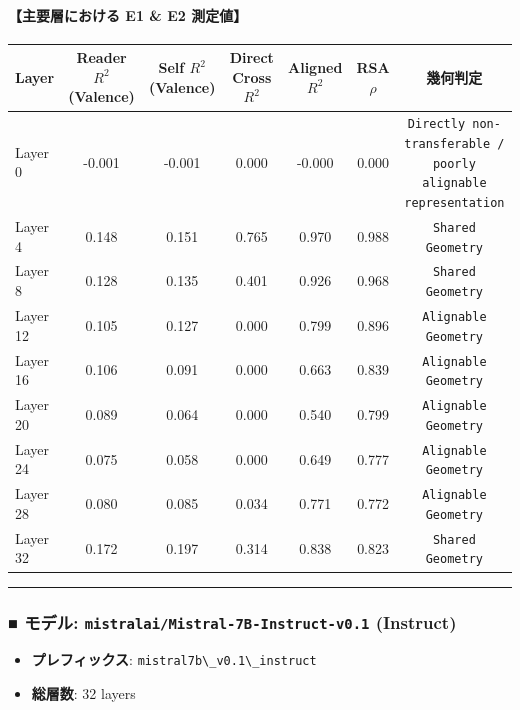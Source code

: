 \paragraph{【主要層における E1 \& E2 測定値】}
\begin{center}
\small
\begin{tabular}{lcccccc}
\toprule
\textbf{Layer} & \textbf{Reader $R^2$ (Valence)} & \textbf{Self $R^2$ (Valence)} & \textbf{Direct Cross $R^2$} & \textbf{Aligned $R^2$} & \textbf{RSA $\rho$} & \textbf{幾何判定} \\
\midrule
Layer  0 & -0.001 & -0.001 & 0.000 & -0.000 & 0.000 & \texttt{Directly non-transferable / poorly alignable representation} \\
Layer  4 & 0.148 & 0.151 & 0.765 & 0.970 & 0.988 & \texttt{Shared Geometry} \\
Layer  8 & 0.128 & 0.135 & 0.401 & 0.926 & 0.968 & \texttt{Shared Geometry} \\
Layer 12 & 0.105 & 0.127 & 0.000 & 0.799 & 0.896 & \texttt{Alignable Geometry} \\
Layer 16 & 0.106 & 0.091 & 0.000 & 0.663 & 0.839 & \texttt{Alignable Geometry} \\
Layer 20 & 0.089 & 0.064 & 0.000 & 0.540 & 0.799 & \texttt{Alignable Geometry} \\
Layer 24 & 0.075 & 0.058 & 0.000 & 0.649 & 0.777 & \texttt{Alignable Geometry} \\
Layer 28 & 0.080 & 0.085 & 0.034 & 0.771 & 0.772 & \texttt{Alignable Geometry} \\
Layer 32 & 0.172 & 0.197 & 0.314 & 0.838 & 0.823 & \texttt{Shared Geometry} \\
\bottomrule
\end{tabular}
\end{center}



\vspace{0.5em}\hrule\vspace{0.5em}

\subsubsection{■ モデル: \texttt{mistralai/Mistral-7B-Instruct-v0.1} (Instruct)}
\begin{itemize}
\item \textbf{プレフィックス}: \texttt{mistral7b\textbackslash{}\_v0.1\textbackslash{}\_instruct}
\item \textbf{総層数}: 32 layers
\end{itemize}

